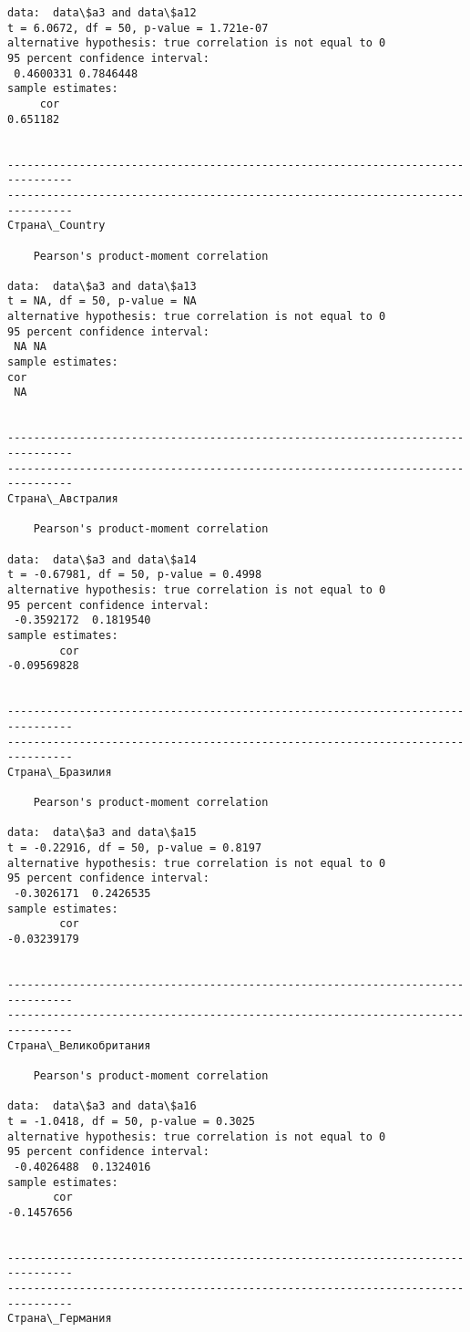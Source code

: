 \documentclass[11pt,mathletters]{article}
\begin{document}
\begin{Verbatim}[commandchars=\\\{\}]
data:  data\$a3 and data\$a12
t = 6.0672, df = 50, p-value = 1.721e-07
alternative hypothesis: true correlation is not equal to 0
95 percent confidence interval:
 0.4600331 0.7846448
sample estimates:
     cor 
0.651182 


--------------------------------------------------------------------------------
--------------------------------------------------------------------------------
Страна\_Country

	Pearson's product-moment correlation

data:  data\$a3 and data\$a13
t = NA, df = 50, p-value = NA
alternative hypothesis: true correlation is not equal to 0
95 percent confidence interval:
 NA NA
sample estimates:
cor 
 NA 


--------------------------------------------------------------------------------
--------------------------------------------------------------------------------
Страна\_Австралия

	Pearson's product-moment correlation

data:  data\$a3 and data\$a14
t = -0.67981, df = 50, p-value = 0.4998
alternative hypothesis: true correlation is not equal to 0
95 percent confidence interval:
 -0.3592172  0.1819540
sample estimates:
        cor 
-0.09569828 


--------------------------------------------------------------------------------
--------------------------------------------------------------------------------
Страна\_Бразилия

	Pearson's product-moment correlation

data:  data\$a3 and data\$a15
t = -0.22916, df = 50, p-value = 0.8197
alternative hypothesis: true correlation is not equal to 0
95 percent confidence interval:
 -0.3026171  0.2426535
sample estimates:
        cor 
-0.03239179 


--------------------------------------------------------------------------------
--------------------------------------------------------------------------------
Страна\_Великобритания

	Pearson's product-moment correlation

data:  data\$a3 and data\$a16
t = -1.0418, df = 50, p-value = 0.3025
alternative hypothesis: true correlation is not equal to 0
95 percent confidence interval:
 -0.4026488  0.1324016
sample estimates:
       cor 
-0.1457656 


--------------------------------------------------------------------------------
--------------------------------------------------------------------------------
Страна\_Германия


\end{Verbatim}
\end{document}
